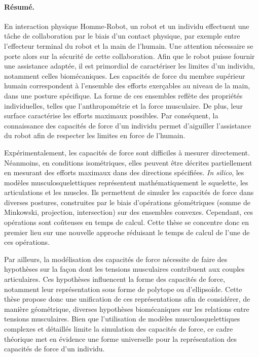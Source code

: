 \paragraph*{Résumé.} En interaction physique Homme-Robot, un robot et un individu effectuent une tâche de collaboration par le biais d'un contact physique, par exemple entre l'effecteur terminal du robot et la main de l'humain. Une attention nécessaire se porte alors sur la sécurité de cette collaboration. Afin que le robot puisse fournir une assistance adaptée, il est primordial de caractériser les limites d'un individu, notamment celles biomécaniques. Les capacités de force du membre supérieur humain correspondent à l'ensemble des efforts exerçables au niveau de la main, dans une posture spécifique. La forme de ces ensembles reflète des propriétés individuelles, telles que l'anthropométrie et la force musculaire. De plus, leur surface caractérise les efforts maximaux possibles. Par conséquent, la connaissance des capacités de force d'un individu permet d'aiguiller l'assistance du robot afin de respecter les limites en force de l'humain.

Expérimentalement, les capacités de force sont difficiles à mesurer directement. Néanmoins, en conditions isométriques, elles peuvent être décrites partiellement en mesurant des efforts maximaux dans des directions spécifiées. \emph{In silico}, les modèles musculosquelettiques représentent mathématiquement le squelette, les articulations et les muscles. Ils permettent de simuler les capacités de force dans diverses postures, construites par le biais d'opérations géométriques (somme de Minkowski, projection, intersection) sur des ensembles convexes. Cependant, ces opérations sont coûteuses en temps de calcul. Cette thèse se concentre donc en premier lieu sur une nouvelle approche réduisant le temps de calcul de l'une de ces opérations.

Par ailleurs, la modélisation des capacités de force nécessite de faire des hypothèses sur la façon dont les tensions musculaires contribuent aux couples articulaires. Ces hypothèses influencent la forme des capacités de force, notamment leur représentation sous forme de polytope ou d'ellipsoïde. Cette thèse propose donc une unification de ces représentations afin de considérer, de manière géométrique, diverses hypothèses biomécaniques sur les relations entre tensions musculaires. Bien que l'utilisation de modèles musculosquelettiques complexes et détaillés limite la simulation des capacités de force, ce cadre théorique met en évidence une forme universelle pour la représentation des capacités de force d'un individu.

